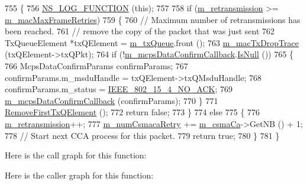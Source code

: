 \begin{DoxyCode}
755 \{
756   \hyperlink{log-macros-disabled_8h_a90b90d5bad1f39cb1b64923ea94c0761}{NS\_LOG\_FUNCTION} (\textcolor{keyword}{this});
757 
758   \textcolor{keywordflow}{if} (\hyperlink{classns3_1_1LrWpanMac_afa6dceab5f0fec699c907ea8c61ffa39}{m\_retransmission} >= \hyperlink{classns3_1_1LrWpanMac_a4c627b0db8f366077e108ede4268cf7c}{m\_macMaxFrameRetries})
759     \{
760       \textcolor{comment}{// Maximum number of retransmissions has been reached.}
761       \textcolor{comment}{// remove the copy of the packet that was just sent}
762       TxQueueElement *txQElement = \hyperlink{classns3_1_1LrWpanMac_a90ea1fb2b1cec84e8ca2177772a1644d}{m\_txQueue}.front ();
763       \hyperlink{classns3_1_1LrWpanMac_a3ff373bbe119ee781fda57327163b43a}{m\_macTxDropTrace} (txQElement->txQPkt);
764       \textcolor{keywordflow}{if} (!\hyperlink{classns3_1_1LrWpanMac_a05eba7a98d1cbbf86151290069e093e0}{m\_mcpsDataConfirmCallback}.\hyperlink{classns3_1_1Callback_aa8e27826badbf37f84763f36f70d9b54}{IsNull} ())
765         \{
766           McpsDataConfirmParams confirmParams;
767           confirmParams.m\_msduHandle = txQElement->txQMsduHandle;
768           confirmParams.m\_status = \hyperlink{group__lr-wpan_gga50d67c8816b2ca8da8df30d045b1b705a41f6dfd2ce069ea23beba15a41c09c25}{IEEE\_802\_15\_4\_NO\_ACK};
769           \hyperlink{classns3_1_1LrWpanMac_a05eba7a98d1cbbf86151290069e093e0}{m\_mcpsDataConfirmCallback} (confirmParams);
770         \}
771       \hyperlink{classns3_1_1LrWpanMac_a359da7ecf2f56e4f62f5e8173bf989dd}{RemoveFirstTxQElement} ();
772       \textcolor{keywordflow}{return} \textcolor{keyword}{false};
773     \}
774   \textcolor{keywordflow}{else}
775     \{
776       \hyperlink{classns3_1_1LrWpanMac_afa6dceab5f0fec699c907ea8c61ffa39}{m\_retransmission}++;
777       \hyperlink{classns3_1_1LrWpanMac_a1859006076f65683c1fa442375d706a6}{m\_numCsmacaRetry} += \hyperlink{classns3_1_1LrWpanMac_a03fc5a3a267a984f8ec0ba62ff9da270}{m\_csmaCa}->GetNB () + 1;
778       \textcolor{comment}{// Start next CCA process for this packet.}
779       \textcolor{keywordflow}{return} \textcolor{keyword}{true};
780     \}
781 \}
\end{DoxyCode}


Here is the call graph for this function\+:




Here is the caller graph for this function\+:


